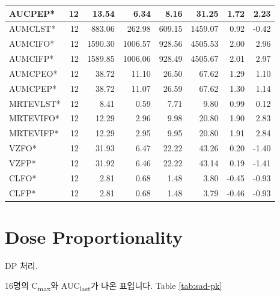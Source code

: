 \documentclass[
  10pt,
]{krantz}
\begin{document}
\begin{tabular}{l|r|r|r|r|r|r|r}
\hline
AUCPEP* & 12 & 13.54 & 6.34 & 8.16 & 31.25 & 1.72 & 2.23\\
\hline
AUMCLST* & 12 & 883.06 & 262.98 & 609.15 & 1459.07 & 0.92 & -0.42\\
\hline
AUMCIFO* & 12 & 1590.30 & 1006.57 & 928.56 & 4505.53 & 2.00 & 2.96\\
\hline
AUMCIFP* & 12 & 1589.85 & 1006.06 & 928.49 & 4505.67 & 2.01 & 2.97\\
\hline
AUMCPEO* & 12 & 38.72 & 11.10 & 26.50 & 67.62 & 1.29 & 1.10\\
\hline
AUMCPEP* & 12 & 38.72 & 11.07 & 26.59 & 67.62 & 1.30 & 1.14\\
\hline
MRTEVLST* & 12 & 8.41 & 0.59 & 7.71 & 9.80 & 0.99 & 0.12\\
\hline
MRTEVIFO* & 12 & 12.29 & 2.96 & 9.98 & 20.80 & 1.90 & 2.83\\
\hline
MRTEVIFP* & 12 & 12.29 & 2.95 & 9.95 & 20.80 & 1.91 & 2.84\\
\hline
VZFO* & 12 & 31.93 & 6.47 & 22.22 & 43.26 & 0.20 & -1.40\\
\hline
VZFP* & 12 & 31.92 & 6.46 & 22.22 & 43.14 & 0.19 & -1.41\\
\hline
CLFO* & 12 & 2.81 & 0.68 & 1.48 & 3.80 & -0.45 & -0.93\\
\hline
CLFP* & 12 & 2.81 & 0.68 & 1.48 & 3.79 & -0.46 & -0.93\\
\hline
\end{tabular}

\hypertarget{dp}{%
\section{Dose Proportionality}\label{dp}}

DP 처리.

16명의 C\textsubscript{max}와 AUC\textsubscript{last}가 나온 표입니다. Table \ref{tab:sad-pk}
\end{document}
